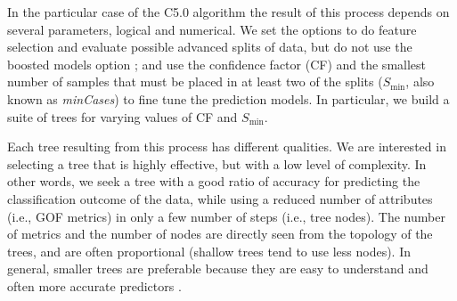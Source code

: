 In the particular case of the C5.0 algorithm the result of this process depends on several parameters, logical and numerical. We set the options to do feature selection and evaluate possible advanced splits of data, but do not use the boosted models option \citep[see][]{Kuhn_2017_Manual}; and use the confidence factor (CF) and the smallest number of samples that must be placed in at least two of the splits ($S_{\min}$, also known as \textit{minCases}) to fine tune the prediction models. In particular, we build a suite of trees for varying values of CF and $S_{\min}$.

Each tree resulting from this process has different qualities. We are interested in selecting a tree that is highly effective, but with a low level of complexity. In other words, we seek a tree with a good ratio of accuracy for predicting the classification outcome of the data, while using a reduced number of attributes (i.e., GOF metrics) in only a few number of steps (i.e., tree nodes). The number of metrics and the number of nodes are directly seen from the topology of the trees, and are often proportional (shallow trees tend to use less nodes). In general, smaller trees are preferable because they are easy to understand and often more accurate predictors \citep{Quinlan_1996_JAIR}.

